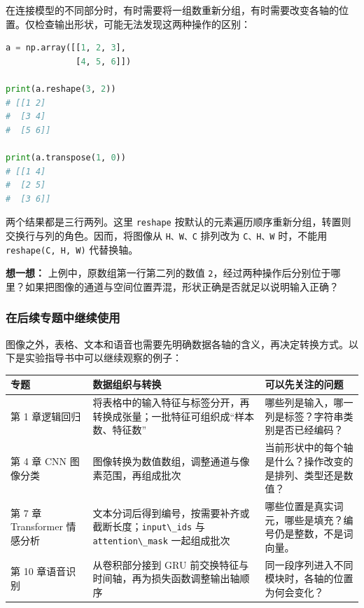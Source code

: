 \documentclass[UTF8,a4paper,11pt,fontset=fandol]{ctexart}
\providecommand{\passthrough}[1]{#1}
\begin{document}
在连接模型的不同部分时，有时需要将一组数重新分组，有时需要改变各轴的位置。仅检查输出形状，可能无法发现这两种操作的区别：

\begin{lstlisting}[language=Python]
a = np.array([[1, 2, 3],
              [4, 5, 6]])

print(a.reshape(3, 2))
# [[1 2]
#  [3 4]
#  [5 6]]

print(a.transpose(1, 0))
# [[1 4]
#  [2 5]
#  [3 6]]
\end{lstlisting}

两个结果都是三行两列。这里 \passthrough{\lstinline!reshape!} 按默认的元素遍历顺序重新分组，转置则交换行与列的角色。因而，将图像从 \passthrough{\lstinline!H、W、C!} 排列改为 \passthrough{\lstinline!C、H、W!} 时，不能用 \passthrough{\lstinline!reshape(C, H, W)!} 代替换轴。

\textbf{想一想：} 上例中，原数组第一行第二列的数值 \passthrough{\lstinline!2!}，经过两种操作后分别位于哪里？如果把图像的通道与空间位置弄混，形状正确是否就足以说明输入正确？

\subsubsection{在后续专题中继续使用}\label{ux5728ux540eux7eedux4e13ux9898ux4e2dux7ee7ux7eedux4f7fux7528}

图像之外，表格、文本和语音也需要先明确数据各轴的含义，再决定转换方式。以下是实验指导书中可以继续观察的例子：

\begin{longtable}[]{@{}
  >{\raggedright\arraybackslash}p{}
  >{\raggedright\arraybackslash}p{}
  >{\raggedright\arraybackslash}p{}@{}}
\toprule\noalign{}
\begin{minipage}[b]{\linewidth}\raggedright
专题
\end{minipage} & \begin{minipage}[b]{\linewidth}\raggedright
数据组织与转换
\end{minipage} & \begin{minipage}[b]{\linewidth}\raggedright
可以先关注的问题
\end{minipage} \\
\midrule\noalign{}
\endhead
\bottomrule\noalign{}
\endlastfoot
第 1 章逻辑回归 & 将表格中的输入特征与标签分开，再转换成张量；一批特征可组织成``样本数、特征数'' & 哪些列是输入，哪一列是标签？字符串类别是否已经编码？ \\
第 4 章 CNN 图像分类 & 图像转换为数值数组，调整通道与像素范围，再组成批次 & 当前形状中的每个轴是什么？操作改变的是排列、类型还是数值？ \\
第 7 章 Transformer 情感分析 & 文本分词后得到编号，按需要补齐或截断长度；\passthrough{\lstinline!input\_ids!} 与 \passthrough{\lstinline!attention\_mask!} 一起组成批次 & 哪些位置是真实词元，哪些是填充？编号仍是整数，不是词向量。 \\
第 10 章语音识别 & 从卷积部分接到 GRU 前交换特征与时间轴，再为损失函数调整输出轴顺序 & 同一段序列进入不同模块时，各轴的位置为何会变化？ \\
\end{longtable}
\end{document}
